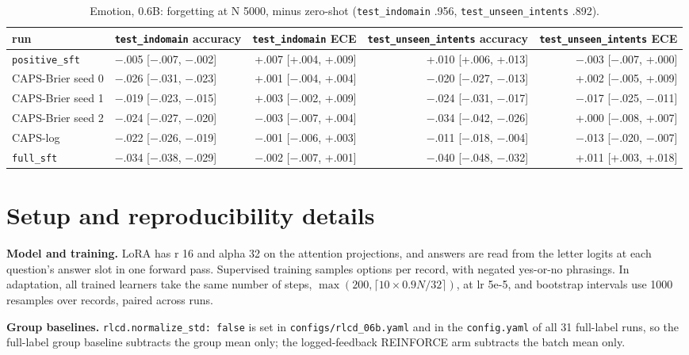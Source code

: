 \documentclass[10pt,letterpaper]{article}
\theoremstyle{plain}
\begin{document}
\begin{table}[H]
\centering
\small
\caption{Emotion, 0.6B: forgetting at N 5000, minus zero-shot (\texttt{test\_indomain} .956, \texttt{test\_unseen\_intents} .892).}
\label{tab:A7e}
\begin{adjustbox}{max width=\textwidth}
\begin{tabular}{llrrr}
\toprule
run & \texttt{test\_indomain} accuracy & \texttt{test\_indomain} ECE & \texttt{test\_unseen\_intents} accuracy & \texttt{test\_unseen\_intents} ECE \\
\midrule
\texttt{positive\_sft} & $-$.005 [$-$.007, $-$.002] & +.007 [+.004, +.009] & +.010 [+.006, +.013] & $-$.003 [$-$.007, +.000] \\
CAPS-Brier seed 0 & $-$.026 [$-$.031, $-$.023] & +.001 [$-$.004, +.004] & $-$.020 [$-$.027, $-$.013] & +.002 [$-$.005, +.009] \\
CAPS-Brier seed 1 & $-$.019 [$-$.023, $-$.015] & +.003 [$-$.002, +.009] & $-$.024 [$-$.031, $-$.017] & $-$.017 [$-$.025, $-$.011] \\
CAPS-Brier seed 2 & $-$.024 [$-$.027, $-$.020] & $-$.003 [$-$.007, +.004] & $-$.034 [$-$.042, $-$.026] & +.000 [$-$.008, +.007] \\
CAPS-log & $-$.022 [$-$.026, $-$.019] & $-$.001 [$-$.006, +.003] & $-$.011 [$-$.018, $-$.004] & $-$.013 [$-$.020, $-$.007] \\
\texttt{full\_sft} & $-$.034 [$-$.038, $-$.029] & $-$.002 [$-$.007, +.001] & $-$.040 [$-$.048, $-$.032] & +.011 [+.003, +.018] \\
\bottomrule
\end{tabular}
\end{adjustbox}
\end{table}

\clearpage
\section{Setup and reproducibility details}\label{sec:setup}

\textbf{Model and training.} LoRA has r 16 and alpha 32 on the attention projections, and answers are read from the letter logits at each question's answer slot in one forward pass. Supervised training samples options per record, with negated yes-or-no phrasings. In adaptation, all trained learners take the same number of steps, $\max(200, \lceil 10 \times 0.9 N / 32 \rceil)$, at lr 5e-5, and bootstrap intervals use 1000 resamples over records, paired across runs.

\textbf{Group baselines.} \texttt{rlcd.normalize\_std: false} is set in \texttt{configs/rlcd\_06b.yaml} and in the \texttt{config.yaml} of all 31 full-label runs, so the full-label group baseline subtracts the group mean only; the logged-feedback REINFORCE arm subtracts the batch mean only.
\end{document}
